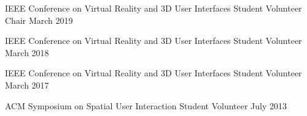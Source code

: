 \begin{cventries}
  \cventry
    {IEEE Conference on Virtual Reality and 3D User Interfaces} %
    {Student Volunteer Chair} %
    {March 2019} %
    {} %
    {}
    \vspace{-0.15in}
    
  \cventry
    {IEEE Conference on Virtual Reality and 3D User Interfaces} %
    {Student Volunteer} %
    {March 2018} %
    {} %
    {}
    \vspace{-0.15in}
    
  \cventry
    {IEEE Conference on Virtual Reality and 3D User Interfaces} %
    {Student Volunteer} %
    {March 2017} %
    {} %
    {}
    \vspace{-0.15in}
    
  \cventry
    {ACM Symposium on Spatial User Interaction} %
    {Student Volunteer} %
    {July 2013} %
    {} %
    {}
    \vspace{-0.15in}
    
    
    
    
    
\end{cventries}
  \vspace{-.25cm}
  \vspace{.25cm}
  
